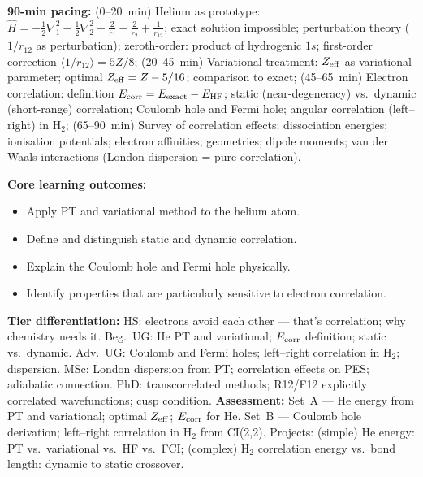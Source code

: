 \documentclass[11pt,a4paper]{article}
\begin{document}
\begin{tcolorbox}[chembox, title={Module~III.2 --- Lecture L03: Polyelectronic Systems and Electron Correlation}]
\textbf{90-min pacing:} (0--20~min) Helium as prototype: $\hat{H}=-\tfrac{1}{2}\nabla_1^2-\tfrac{1}{2}\nabla_2^2-\tfrac{2}{r_1}-\tfrac{2}{r_2}+\tfrac{1}{r_{12}}$; exact solution impossible; perturbation theory ($1/r_{12}$ as perturbation); zeroth-order: product of hydrogenic $1s$; first-order correction $\langle1/r_{12}\rangle=5Z/8$; (20--45~min) Variational treatment: $Z_{\rm eff}$ as variational parameter; optimal $Z_{\rm eff}=Z-5/16$; comparison to exact; (45--65~min) Electron correlation: definition $E_{\rm corr}=E_{\rm exact}-E_{\rm HF}$; static (near-degeneracy) vs.\ dynamic (short-range) correlation; Coulomb hole and Fermi hole; angular correlation (left--right) in H$_2$; (65--90~min) Survey of correlation effects: dissociation energies; ionisation potentials; electron affinities; geometries; dipole moments; van der Waals interactions (London dispersion = pure correlation).

\medskip\textbf{Core learning outcomes:}
\begin{itemize}[leftmargin=1.4em,topsep=2pt,itemsep=1pt]
  \item Apply PT and variational method to the helium atom.
  \item Define and distinguish static and dynamic correlation.
  \item Explain the Coulomb hole and Fermi hole physically.
  \item Identify properties that are particularly sensitive to electron correlation.
\end{itemize}
\medskip\textbf{Tier differentiation:}
HS: electrons avoid each other --- that's correlation; why chemistry needs it.
Beg.\ UG: He PT and variational; $E_{\rm corr}$ definition; static vs.\ dynamic.
Adv.\ UG: Coulomb and Fermi holes; left--right correlation in H$_2$; dispersion.
MSc: London dispersion from PT; correlation effects on PES; adiabatic connection.
PhD: transcorrelated methods; R12/F12 explicitly correlated wavefunctions; cusp condition.
\medskip\textbf{Assessment:}
Set~A --- He energy from PT and variational; optimal $Z_{\rm eff}$; $E_{\rm corr}$ for He.
Set~B --- Coulomb hole derivation; left--right correlation in H$_2$ from CI(2,2).
Projects: (simple) He energy: PT vs.\ variational vs.\ HF vs.\ FCI; (complex) H$_2$ correlation energy vs.\ bond length: dynamic to static crossover.
\end{tcolorbox}
\end{document}
